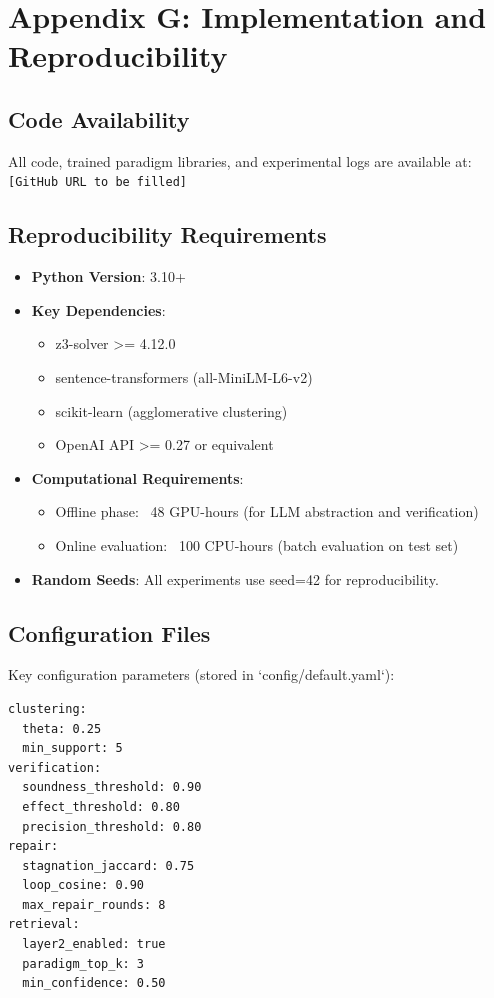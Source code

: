 
\section{Appendix G: Implementation and Reproducibility}

\subsection{Code Availability}

All code, trained paradigm libraries, and experimental logs are available at: \texttt{[GitHub URL to be filled]}

\subsection{Reproducibility Requirements}

\begin{itemize}
    \item \textbf{Python Version}: 3.10+
    \item \textbf{Key Dependencies}:
        \begin{itemize}
            \item z3-solver >= 4.12.0
            \item sentence-transformers (all-MiniLM-L6-v2)
            \item scikit-learn (agglomerative clustering)
            \item OpenAI API >= 0.27 or equivalent
        \end{itemize}
    \item \textbf{Computational Requirements}:
        \begin{itemize}
            \item Offline phase: ~48 GPU-hours (for LLM abstraction and verification)
            \item Online evaluation: ~100 CPU-hours (batch evaluation on test set)
        \end{itemize}
    \item \textbf{Random Seeds}: All experiments use seed=42 for reproducibility.
\end{itemize}

\subsection{Configuration Files}

Key configuration parameters (stored in `config/default.yaml`):
\begin{verbatim}
clustering:
  theta: 0.25
  min_support: 5
verification:
  soundness_threshold: 0.90
  effect_threshold: 0.80
  precision_threshold: 0.80
repair:
  stagnation_jaccard: 0.75
  loop_cosine: 0.90
  max_repair_rounds: 8
retrieval:
  layer2_enabled: true
  paradigm_top_k: 3
  min_confidence: 0.50
\end{verbatim}
